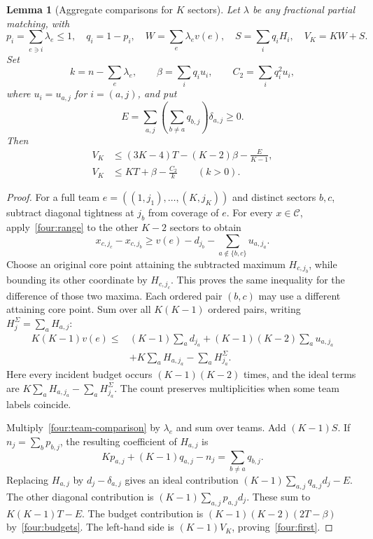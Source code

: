 \documentclass[11pt]{article}
\newtheorem{lemma}[theorem]{Lemma}
\theoremstyle{remark}
\newcommand{\core}{\mathcal C}
\begin{document}
\begin{lemma}[Aggregate comparisons for $K$ sectors]\label{four:aggregate}
Let $\lambda$ be any fractional partial matching, with
\[
 p_i=\sum_{e\ni i}\lambda_e\le1,\quad q_i=1-p_i,\quad
 W=\sum_e\lambda_ev(e),\quad S=\sum_iq_iH_i,\quad V_K=KW+S.
\]
Set
\[
 k=n-\sum_e\lambda_e,\qquad
 \beta=\sum_iq_iu_i,\qquad C_2=\sum_iq_i^2u_i,
\]
where $u_i=u_{a,j}$ for $i=(a,j)$, and put
\[
 E=\sum_{a,j}\left(\sum_{b\ne a}q_{b,j}\right)\delta_{a,j}\ge0.
\]
Then
\begin{align}
 V_K&\le (3K-4)T-(K-2)\beta-\frac{E}{K-1},
        \label{four:first}\\
 V_K&\le KT+\beta-\frac{C_2}{k}\qquad(k>0).
        \label{four:second}
\end{align}
\end{lemma}
\begin{proof}
For a full team $e=((1,j_1),\ldots,(K,j_K))$ and distinct sectors
$b,c$, subtract diagonal tightness at $j_b$ from coverage of $e$.
For every $x\in\core$, apply~\eqref{four:range} to the other $K-2$
sectors to obtain
\[
 x_{c,j_c}-x_{c,j_b}
 \ge v(e)-d_{j_b}-\sum_{a\notin\{b,c\}}u_{a,j_a}.
\]
Choose an original core point attaining the subtracted maximum
$H_{c,j_b}$, while bounding its other coordinate by $H_{c,j_c}$.
This proves the same inequality for the difference of those two maxima.
Each ordered pair $(b,c)$ may use a different attaining core point.
Sum over all $K(K-1)$ ordered pairs, writing
$H_j^\Sigma=\sum_aH_{a,j}$:
\begin{equation}\label{four:team-comparison}
\begin{split}
 K(K-1)v(e)\le{}&(K-1)\sum_a d_{j_a}
       +(K-1)(K-2)\sum_a u_{a,j_a}\\
       &+K\sum_aH_{a,j_a}-\sum_aH_{j_a}^\Sigma.
\end{split}
\end{equation}
Here every incident budget occurs $(K-1)(K-2)$ times, and the ideal
terms are $K\sum_aH_{a,j_a}-\sum_aH_{j_a}^{\Sigma}$.
The count preserves multiplicities when some team labels coincide.

Multiply~\eqref{four:team-comparison} by $\lambda_e$ and sum over
teams. Add $(K-1)S$. If $n_j=\sum_bp_{b,j}$, the resulting coefficient
of $H_{a,j}$ is
\[
       Kp_{a,j}+(K-1)q_{a,j}-n_j
                   =\sum_{b\ne a}q_{b,j}.
\]
Replacing $H_{a,j}$ by $d_j-\delta_{a,j}$ gives an ideal contribution
$(K-1)\sum_{a,j}q_{a,j}d_j-E$. The other diagonal contribution is
$(K-1)\sum_{a,j}p_{a,j}d_j$. These sum to $K(K-1)T-E$.
The budget contribution is
$(K-1)(K-2)(2T-\beta)$ by~\eqref{four:budgets}.
The left-hand side is $(K-1)V_K$, proving~\eqref{four:first}.


\end{proof}
\end{document}
